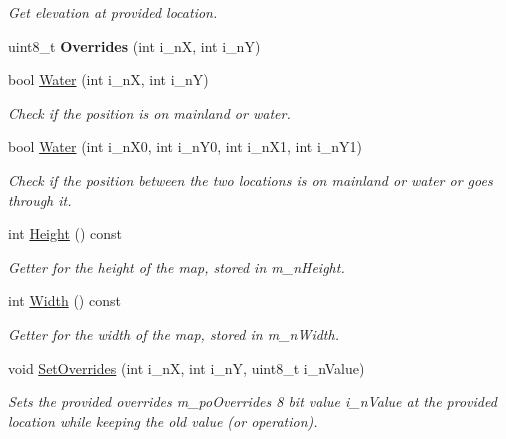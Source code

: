 \begin{DoxyCompactItemize}
\begin{DoxyCompactList}\small\item\em Get elevation at provided location. \end{DoxyCompactList}\item 
\mbox{\label{classplanner_1_1c_graph_adf0a3350d15819b92ec14c4596ebf702}} 
uint8\+\_\+t {\bfseries Overrides} (int i\+\_\+nX, int i\+\_\+nY)
\item 
bool \mbox{\hyperlink{classplanner_1_1c_graph_a97108b0e05fa547c006d76e749d52f27}{Water}} (int i\+\_\+nX, int i\+\_\+nY)
\begin{DoxyCompactList}\small\item\em Check if the position is on mainland or water. \end{DoxyCompactList}\item 
bool \mbox{\hyperlink{classplanner_1_1c_graph_a99935ff4c32d229e6006aaa843a685a9}{Water}} (int i\+\_\+n\+X0, int i\+\_\+n\+Y0, int i\+\_\+n\+X1, int i\+\_\+n\+Y1)
\begin{DoxyCompactList}\small\item\em Check if the position between the two locations is on mainland or water or goes through it. \end{DoxyCompactList}\item 
int \mbox{\hyperlink{classplanner_1_1c_graph_a5c163af76e19303794a908304f3b759e}{Height}} () const
\begin{DoxyCompactList}\small\item\em Getter for the height of the map, stored in m\+\_\+n\+Height. \end{DoxyCompactList}\item 
int \mbox{\hyperlink{classplanner_1_1c_graph_a25e3f4ee33c86a8a0c3a31c42dac7607}{Width}} () const
\begin{DoxyCompactList}\small\item\em Getter for the width of the map, stored in m\+\_\+n\+Width. \end{DoxyCompactList}\item 
void \mbox{\hyperlink{classplanner_1_1c_graph_a6da6e6e269013628aef48245a7787cb9}{Set\+Overrides}} (int i\+\_\+nX, int i\+\_\+nY, uint8\+\_\+t i\+\_\+n\+Value)
\begin{DoxyCompactList}\small\item\em Sets the provided overrides m\+\_\+po\+Overrides 8 bit value i\+\_\+n\+Value at the provided location while keeping the old value (or operation). \end{DoxyCompactList}\end{DoxyCompactItemize}
